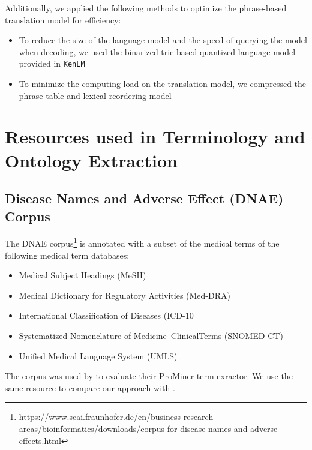 \noindent Additionally, we applied the following methods to optimize the phrase-based translation model for efficiency:

\begin{itemize}
\item To reduce the size of the language model and the speed of querying the model when decoding, we used the binarized trie-based quantized language model provided in {\tt KenLM} \citep{kenlmTrieQuantized,whittaker2001quantization}

\item To minimize the computing load on the translation model, we compressed the phrase-table and lexical reordering model \citep{junczys2012phrasal} %

\end{itemize}

\newpage
\section{Resources used in Terminology and Ontology Extraction}

\subsection{Disease Names and Adverse Effect (DNAE) Corpus}

The DNAE corpus\footnote{\url{https://www.scai.fraunhofer.de/en/business-research-areas/bioinformatics/downloads/corpus-for-disease-names-and-adverse-effects.html}} is annotated with a subset of the medical terms of the following medical term databases:

\begin{itemize}[noitemsep]
\item Medical Subject Headings (MeSH)
\item Medical  Dictionary  for  Regulatory  Activities  (Med-DRA)
\item International   Classification   of   Diseases   (ICD-10
\item Systematized    Nomenclature    of    Medicine–ClinicalTerms (SNOMED CT)
\item Unified  Medical  Language  System  (UMLS)
\end{itemize}

The corpus was used by \cite{Hanisch2005} to evaluate their ProMiner term exractor. We use the same resource to compare our approach with \cite{Hanisch2005}.


